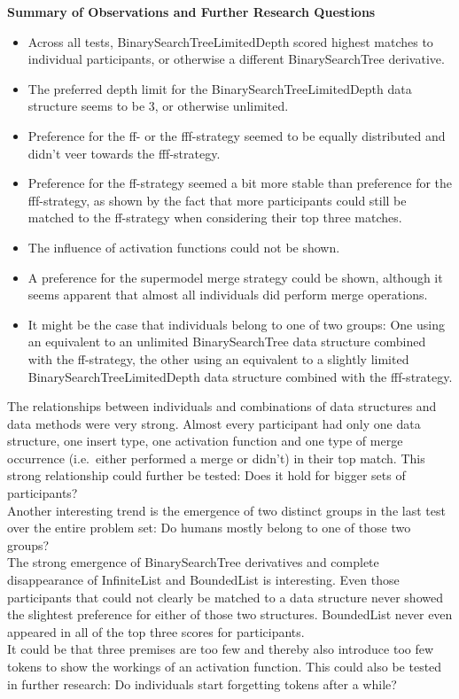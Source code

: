 \documentclass[hidelinks]{scrartcl}
\begin{document}
\textbf{Summary of Observations and Further Research Questions}
\begin{itemize}
	\item Across all tests, BinarySearchTreeLimitedDepth scored highest matches to individual participants, or otherwise a different BinarySearchTree derivative.
	\item The preferred depth limit for the BinarySearchTreeLimitedDepth data structure seems to be 3, or otherwise unlimited.
	\item Preference for the ff- or the fff-strategy seemed to be equally distributed and didn't veer towards the fff-strategy.
	\item Preference for the ff-strategy seemed a bit more stable than preference for the fff-strategy, as shown by the fact that more participants could still be matched to the ff-strategy when considering their top three matches.
	\item The influence of activation functions could not be shown.
	\item A preference for the supermodel merge strategy could be shown, although it seems apparent that almost all individuals did perform merge operations.
	\item It might be the case that individuals belong to one of two groups: One using an equivalent to an unlimited BinarySearchTree data structure combined with the ff-strategy, the other using an equivalent to a slightly limited BinarySearchTreeLimitedDepth data structure combined with the fff-strategy.
\end{itemize}

The relationships between individuals and combinations of data structures and data methods were very strong. Almost every participant had only one data structure, one insert type, one activation function and one type of merge occurrence (i.e.\ either performed a merge or didn't) in their top match. This strong relationship could further be tested: Does it hold for bigger sets of participants? \\
Another interesting trend is the emergence of two distinct groups in the last test over the entire problem set: Do humans mostly belong to one of those two groups? \\
The strong emergence of BinarySearchTree derivatives and complete disappearance of InfiniteList and BoundedList is interesting. Even those participants that could not clearly be matched to a data structure never showed the slightest preference for either of those two structures. BoundedList never even appeared in all of the top three scores for participants. \\
It could be that three premises are too few and thereby also introduce too few tokens to show the workings of an activation function. This could also be tested in further research: Do individuals start forgetting tokens after a while?
\end{document}
